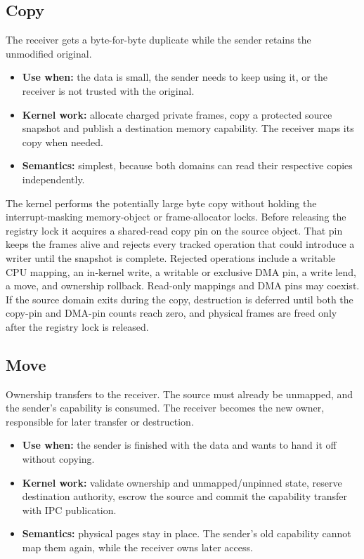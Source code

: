 \subsection{Copy}

The receiver gets a byte-for-byte duplicate while the sender retains the unmodified
original.

\begin{itemize}
    \item \textbf{Use when:} the data is small, the sender needs to keep using it,
        or the receiver is not trusted with the original.
    \item \textbf{Kernel work:} allocate charged private frames, copy a protected
        source snapshot and publish a destination memory capability. The
        receiver maps its copy when needed.
    \item \textbf{Semantics:} simplest, because both domains can read their respective
        copies independently.
\end{itemize}

The kernel performs the potentially large byte copy without holding the
interrupt-masking memory-object or frame-allocator locks. Before releasing the
registry lock it acquires a shared-read copy pin on the source object. That pin
keeps the frames alive and rejects every tracked operation that could introduce
a writer until the snapshot is complete. Rejected operations include a writable
CPU mapping, an in-kernel write, a writable or exclusive DMA pin, a write lend,
a move, and ownership rollback.
Read-only mappings and DMA pins may coexist. If the source domain exits during
the copy, destruction is deferred until both the copy-pin and DMA-pin counts
reach zero, and physical frames are freed only after the registry lock is released.

\subsection{Move}

Ownership transfers to the receiver. The source must already be unmapped, and the
sender's capability is consumed. The receiver becomes the new owner, responsible for later
transfer or destruction.

\begin{itemize}
    \item \textbf{Use when:} the sender is finished with the data and wants to
        hand it off without copying.
    \item \textbf{Kernel work:} validate ownership and unmapped/unpinned state,
        reserve destination authority, escrow the source and commit the
        capability transfer with IPC publication.
    \item \textbf{Semantics:} physical pages stay in place. The sender's old
        capability cannot map them again, while the receiver owns later access.
\end{itemize}

